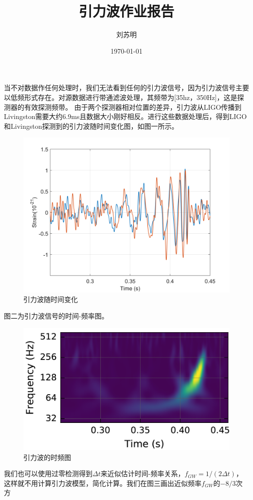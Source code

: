 \documentclass[UTF8]{ctexart}
\title{\heiti 引力波作业报告}
\author{\kaishu 刘苏明}
\date{\today}
\begin{document}
\maketitle

当不对数据作任何处理时，我们无法看到任何的引力波信号，因为引力波信号主要以低频形式存在。对源数据进行带通滤波处理，其频带为[35hz，350Hz]，这是探测器的有效探测频带。 由于两个探测器相对位置的差异，引力波从LIGO传播到Livingston需要大约6.9ms且数据大小刚好相反。进行这些数据处理后，得到LIGO和Livingston探测到的引力波随时间变化图，如图一所示。
\begin{figure}[h]
\centering
\includegraphics[scale = 0.5]{引力波.png}
\caption{引力波随时间变化}
\end{figure}

图二为引力波信号的时间-频率图。
\begin{figure}[h]
\centering
\includegraphics[scale = 0.2]{时频图.png}
\caption{引力波的时频图}
\end{figure}
我们也可以使用过零检测得到$\Delta t$来近似估计时间-频率关系，$f_{GW} = 1/(2\Delta t)$，这样就不用计算引力波模型，简化计算。我们在图三画出近似频率$f_{GW}$的$-8/3$次方
\end{document}
